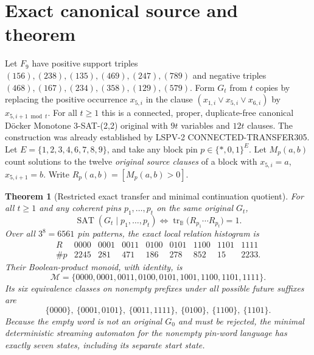 \documentclass[11pt]{article}
\newtheorem{theorem}{Theorem}
\begin{document}
\section{Exact canonical source and theorem}
Let $F_9$ have positive support triples $(156),(238),(135),(469),(247),(789)$ and negative triples $(468),(167),(234),(358),(129),(579)$. Form $G_t$ from $t$ copies by replacing the positive occurrence $x_{5,i}$ in the clause $(x_{1,i}\vee x_{5,i}\vee x_{6,i})$ by $x_{5,i+1\bmod t}$. For all $t\ge1$ this is a connected, proper, duplicate-free canonical D\"ocker Monotone 3-SAT-(2,2) original with $9t$ variables and $12t$ clauses. The construction was already established by LSPV-2 CONNECTED-TRANSFER305.
Let $E=\{1,2,3,4,6,7,8,9\}$, and take any block pin $p\in\{*,0,1\}^{E}$. Let $M_p(a,b)$ count solutions to the twelve \emph{original source clauses} of a block with $x_{5,i}=a$, $x_{5,i+1}=b$. Write $R_p(a,b)=[M_p(a,b)>0]$.
\begin{theorem}[Restricted exact transfer and minimal continuation quotient]
For all $t\ge1$ and any coherent pins $p_1,\ldots,p_t$ on the same original $G_t$,
\[
\operatorname{SAT}(G_t\mid p_1,\ldots,p_t)
\iff\operatorname{tr}_{\mathbb B}\bigl(R_{p_1}\cdots R_{p_t}\bigr)=1.
\]
Over all $3^8=6561$ pin patterns, the exact local relation histogram is
\[
\begin{array}{c|rrrrrrrr}
R&0000&0001&0011&0100&0101&1100&1101&1111\\\hline
\#p&2245&281&471&186&278&852&15&2233.
\end{array}
\]
Their Boolean-product monoid, with identity, is
\[
\mathcal M=\{0000,0001,0011,0100,0101,1001,1100,1101,1111\}.
\]
Its six equivalence classes on \emph{nonempty} prefixes under all possible future suffixes are
\[
\{0000\},\ \{0001,0101\},\ \{0011,1111\},\
\{0100\},\ \{1100\},\ \{1101\}.
\]
Because the empty word is not an original $G_0$ and must be rejected, the minimal deterministic streaming automaton for the \emph{nonempty} pin-word language has exactly seven states, including its separate start state.
\end{theorem}
\end{document}
